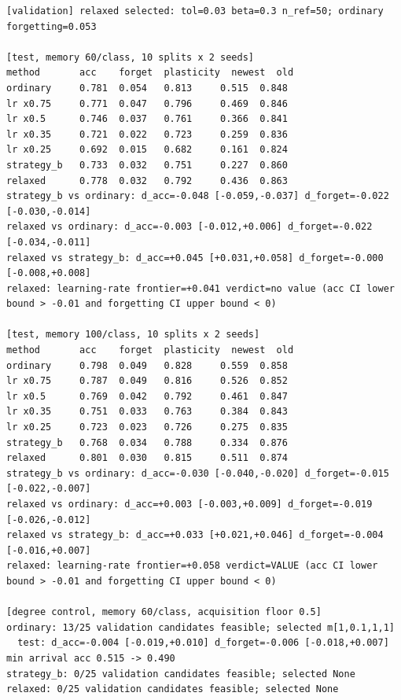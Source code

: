 \documentclass[11pt,a4paper]{article}
\begin{document}
\begin{lstlisting}[language={},basicstyle=\ttfamily\tiny,columns=fixed,breaklines=true,breakindent=0pt]
[validation] relaxed selected: tol=0.03 beta=0.3 n_ref=50; ordinary forgetting=0.053

[test, memory 60/class, 10 splits x 2 seeds]
method       acc    forget  plasticity  newest  old
ordinary     0.781  0.054   0.813     0.515  0.848
lr x0.75     0.771  0.047   0.796     0.469  0.846
lr x0.5      0.746  0.037   0.761     0.366  0.841
lr x0.35     0.721  0.022   0.723     0.259  0.836
lr x0.25     0.692  0.015   0.682     0.161  0.824
strategy_b   0.733  0.032   0.751     0.227  0.860
relaxed      0.778  0.032   0.792     0.436  0.863
strategy_b vs ordinary: d_acc=-0.048 [-0.059,-0.037] d_forget=-0.022 [-0.030,-0.014]
relaxed vs ordinary: d_acc=-0.003 [-0.012,+0.006] d_forget=-0.022 [-0.034,-0.011]
relaxed vs strategy_b: d_acc=+0.045 [+0.031,+0.058] d_forget=-0.000 [-0.008,+0.008]
relaxed: learning-rate frontier=+0.041 verdict=no value (acc CI lower bound > -0.01 and forgetting CI upper bound < 0)

[test, memory 100/class, 10 splits x 2 seeds]
method       acc    forget  plasticity  newest  old
ordinary     0.798  0.049   0.828     0.559  0.858
lr x0.75     0.787  0.049   0.816     0.526  0.852
lr x0.5      0.769  0.042   0.792     0.461  0.847
lr x0.35     0.751  0.033   0.763     0.384  0.843
lr x0.25     0.723  0.023   0.726     0.275  0.835
strategy_b   0.768  0.034   0.788     0.334  0.876
relaxed      0.801  0.030   0.815     0.511  0.874
strategy_b vs ordinary: d_acc=-0.030 [-0.040,-0.020] d_forget=-0.015 [-0.022,-0.007]
relaxed vs ordinary: d_acc=+0.003 [-0.003,+0.009] d_forget=-0.019 [-0.026,-0.012]
relaxed vs strategy_b: d_acc=+0.033 [+0.021,+0.046] d_forget=-0.004 [-0.016,+0.007]
relaxed: learning-rate frontier=+0.058 verdict=VALUE (acc CI lower bound > -0.01 and forgetting CI upper bound < 0)

[degree control, memory 60/class, acquisition floor 0.5]
ordinary: 13/25 validation candidates feasible; selected m[1,0.1,1,1]
  test: d_acc=-0.004 [-0.019,+0.010] d_forget=-0.006 [-0.018,+0.007] min arrival acc 0.515 -> 0.490
strategy_b: 0/25 validation candidates feasible; selected None
relaxed: 0/25 validation candidates feasible; selected None
\end{lstlisting}
\end{document}
